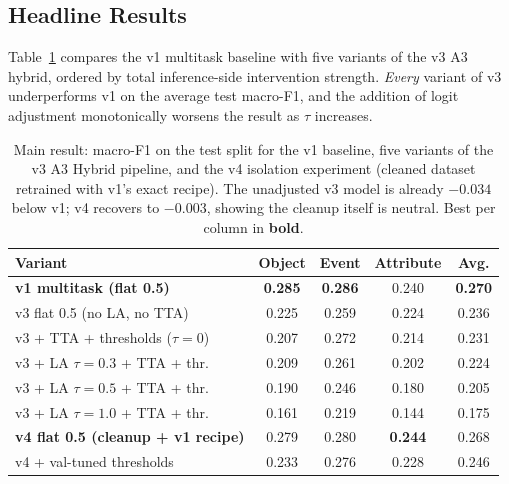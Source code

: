 \documentclass[journal]{IEEEtran}
\begin{document}
\subsection{Headline Results}\label{ssec:headline}

Table~\ref{tab:main} compares the v1 multitask baseline with five variants of the v3 A3 hybrid, ordered by total inference-side intervention strength. \emph{Every} variant of v3 underperforms v1 on the average test macro-F1, and the addition of logit adjustment monotonically worsens the result as $\tau$ increases.

\begin{table}[!t]
  \caption{Main result: macro-F1 on the test split for the v1 baseline, five variants of the v3 A3 Hybrid pipeline, and the v4 isolation experiment (cleaned dataset retrained with v1's exact recipe). The unadjusted v3 model is already $-0.034$ below v1; v4 recovers to $-0.003$, showing the cleanup itself is neutral. Best per column in \textbf{bold}.}
  \label{tab:main}
  \centering
  \small
  \begin{tabular}{@{}lcccc@{}}
  \toprule
  Variant & Object & Event & Attribute & \textbf{Avg.} \\
  \midrule
  \textbf{v1 multitask (flat 0.5)} & \textbf{0.285} & \textbf{0.286} & 0.240 & \textbf{0.270} \\
  \midrule
  v3 flat 0.5 (no LA, no TTA) & 0.225 & 0.259 & 0.224 & 0.236 \\
  v3 + TTA + thresholds ($\tau{=}0$) & 0.207 & 0.272 & 0.214 & 0.231 \\
  v3 + LA $\tau{=}0.3$ + TTA + thr. & 0.209 & 0.261 & 0.202 & 0.224 \\
  v3 + LA $\tau{=}0.5$ + TTA + thr. & 0.190 & 0.246 & 0.180 & 0.205 \\
  v3 + LA $\tau{=}1.0$ + TTA + thr. & 0.161 & 0.219 & 0.144 & 0.175 \\
  \midrule
  \textbf{v4 flat 0.5 (cleanup + v1 recipe)} & 0.279 & 0.280 & \textbf{0.244} & 0.268 \\
  v4 + val-tuned thresholds         & 0.233 & 0.276 & 0.228 & 0.246 \\
  \bottomrule
  \end{tabular}
\end{table}
\end{document}
